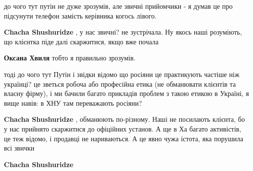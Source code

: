 \begin{itemize}
\begin{itemize}
 
до чого тут путін не дуже зрозумів, але звичні прийомчики - я думав це про підсунути телефон замість керівника когось лівого.

 
\textbf{Chacha Shushuridze} , у нас звичні? не зустрічала. Ну якось наші розуміють, що клієнтка піде далі скаржитися, якщо вже почала

 
\textbf{Оксана Хвиля} тобто я правильно зрозумів.

тоді до чого тут Путін і звідки відомо що росіяни це практикують частіше ніж
українці? це зветься робоча або професійна етика (не обманювати клієнтів та
власну фірму), і ми бачили багато прикладів проблем з такою етикою в Україні, я
вище навів: в ХНУ там переважають росіяни?


 
\textbf{Chacha Shushuridze} , обманюють по-різному. Наші не посилають клієнта,
бо у нас прийнято скаржитися до офіційних установ. А ще в Ха багато активістів,
це теж відомо, і продавці не нариваються. А це явно чужа істота, яка порушила
всі звички

 
\textbf{Chacha Shushuridze} 


\end{itemize}
\end{itemize}
